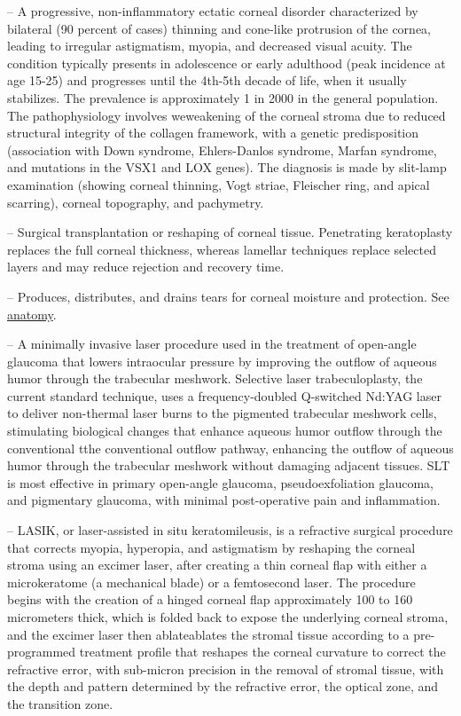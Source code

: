 -- A progressive, non-inflammatory ectatic corneal disorder characterized by bilateral (90 percent of cases) thinning and cone-like protrusion of the cornea, leading to irregular astigmatism, myopia, and decreased visual acuity. The condition typically presents in adolescence or early adulthood (peak incidence at age 15-25) and progresses until the 4th-5th decade of life, when it usually stabilizes. The prevalence is approximately 1 in 2000 in the general population. The pathophysiology involves weweakening of the corneal stroma due to reduced structural integrity of the collagen framework, with a genetic predisposition (association with Down syndrome, Ehlers-Danlos syndrome, Marfan syndrome, and mutations in the VSX1 and LOX genes). The diagnosis is made by slit-lamp examination (showing corneal thinning, Vogt striae, Fleischer ring, and apical scarring), corneal topography, and pachymetry.

-- Surgical transplantation or reshaping of corneal tissue. Penetrating keratoplasty replaces the full corneal thickness, whereas lamellar techniques replace selected layers and may reduce rejection and recovery time.

-- Produces, distributes, and drains tears for corneal moisture and protection. See \hyperlink{Anatomy}{anatomy}.

-- A minimally invasive laser procedure used in the treatment of open-angle glaucoma that lowers intraocular pressure by improving the outflow of aqueous humor through the trabecular meshwork. Selective laser trabeculoplasty, the current standard technique, uses a frequency-doubled Q-switched Nd:YAG laser to deliver non-thermal laser burns to the pigmented trabecular meshwork cells, stimulating biological changes that enhance aqueous humor outflow through the conventional tthe conventional outflow pathway, enhancing the outflow of aqueous humor through the trabecular meshwork without damaging adjacent tissues. SLT is most effective in primary open-angle glaucoma, pseudoexfoliation glaucoma, and pigmentary glaucoma, with minimal post-operative pain and inflammation.

-- LASIK, or laser-assisted in situ keratomileusis, is a refractive surgical procedure that corrects myopia, hyperopia, and astigmatism by reshaping the corneal stroma using an excimer laser, after creating a thin corneal flap with either a microkeratome (a mechanical blade) or a femtosecond laser. The procedure begins with the creation of a hinged corneal flap approximately 100 to 160 micrometers thick, which is folded back to expose the underlying corneal stroma, and the excimer laser then ablateablates the stromal tissue according to a pre-programmed treatment profile that reshapes the corneal curvature to correct the refractive error, with sub-micron precision in the removal of stromal tissue, with the depth and pattern determined by the refractive error, the optical zone, and the transition zone.

